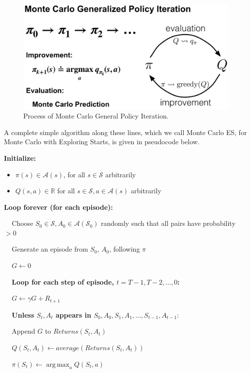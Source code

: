 \documentclass[12pt, a4paper]{article}
\DeclareMathOperator*{\argmax}{arg\,max} %
\begin{document}
\begin{figure}[H]
  \centering  %
    \includegraphics[width=0.8\columnwidth]{images/monte-carlo-policy-iteration.png}
    \caption{Process of Monte Carlo General Policy Iteration.}
    \label{fig:monte-carlo-policy-iteration}
\end{figure}

 A complete simple algorithm along these lines, which we call Monte Carlo ES, for Monte Carlo with Exploring Starts, is given in pseudocode below.



\begin{tcolorbox}[title={Monte Carlo ES (Exploring Starts), for estimating $\pi \approx \pi_*$}]

\textbf{Initialize:}
\begin{itemize}
 \item $\pi(s) \in \mathcal{A}(s)$, for all $s \in \mathcal{S}$ arbitrarily
 \item $Q(s,a) \in \mathbb{R}$ for all $s \in \mathcal{S}, a \in \mathcal{A}(s)$ arbitrarily
\end{itemize}

\textbf{Loop forever (for each episode):}
\begin{description}
   \item $\;\;\;$ Choose $S_0 \in \mathcal{S}, A_0 \in \mathcal{A}(\mathcal{S}_0)$ randomly such that all pairs have probability $> 0$
   \item $\;\;\;$ Generate an episode from $S_0$, $A_0$, following $\pi$
   \item $\;\;\;$ $G \leftarrow 0$
   \item $\;\;\;$ \textbf{Loop for each step of episode, $t=T-1,T-2,...,0$:}
   \begin{description}
     \item $\;\;\;$ $G \leftarrow \gamma G + R_{t+1}$
     \item $\;\;\;$ \textbf{Unless $S_t, A_t$ appears in $S_0, A_0, S_1, A_1, ..., S_{t-1}, A_{t-1}:$}
     \begin{description}
       \item $\;\;\;$ Append $G$ to $Returns(S_t, A_t)$
       \item $\;\;\;$ $Q(S_t, A_t) \leftarrow average(Returns(S_t, A_t))$
       \item $\;\;\;$ $\pi(S_t) \leftarrow \argmax_a Q(S_t, a)$
     \end{description}
   \end{description}
\end{description}
\end{tcolorbox}
\end{document}
